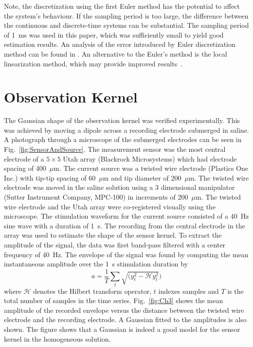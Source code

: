 \documentclass[review,authoryear,3p]{elsarticle}
\begin{document}
Note, the discretization using the first Euler method has the potential to affect the system's behaviour. If the sampling period is too large, the difference between the continuous and discrete-time systems can be substantial. The sampling period of 1~ms was used in this paper, which was sufficiently small to yield good estimation results. An analysis of the error introduced by Euler discretization method can be found in \citet{Butcher2008}. An alternative to the Euler's method is the local linearization method, which may provide improved results~\citep{Ozaki1994}.

\section{Observation Kernel}\label{App:ObsKernelExperiment}
The Gaussian shape of the observation kernel was verified experimentally. This was achieved by moving a dipole across a recording electrode submerged in saline. A photograph through a microscope of the submerged electrodes can be seen in Fig.~\ref{fig:SensorAndSource}. The measurement sensor was the most central electrode of a $5\times5$ Utah array (Blackrock Microsystems) which had electrode spacing of 400~$\mu$m. The current source was a twisted wire electrode (Plastics One Inc.) with tip-tip spacing of 60~$\mu$m and tip diameter of 200~$\mu$m. The twisted wire electrode was moved in the saline solution using a 3 dimensional manipulator (Sutter Instrument Company, MPC-100) in increments of 200~$\mu$m. The twisted wire electrode and the Utah array were co-registered visually using the microscope.
The stimulation waveform for the current source consisted of a 40~Hz sine wave with a duration of 1~s. The recording from the central electrode in the array was used to estimate the shape of the sensor kernel. To extract the amplitude of the signal, the data was first band-pass filtered with a center frequency of 40~Hz. The envelope of the signal was found by computing the mean instantaneous amplitude over the 1~s stimulation duration by
\begin{equation}
	a = \frac{1}{T}\sum_t{\sqrt{(y_t^2-\mathcal{H}y_t^2})}
\end{equation}
where $\mathcal{H}$ denotes the Hilbert transform operator, $t$ indexes samples and $T$ is the total number of samples in the time series. Fig.~\ref{fig:Ch3} shows the mean amplitude of the recorded envelope versus the distance between the twisted wire electrode and the recording electrode. A Gaussian fitted to the amplitudes is also shown. The figure shows that a Gaussian is indeed a good model for the sensor kernel in the homogeneous solution.
\end{document}
